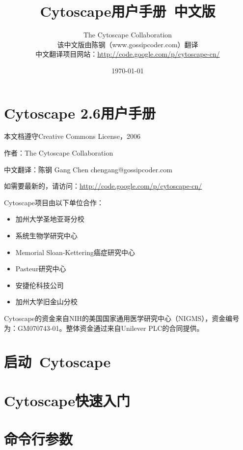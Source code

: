 \documentclass[a4paper, oneside]{book}
\begin{document}
\begin{CJK}{UTF8}{gbsn}
\author{The Cytoscape Collaboration \\ 该中文版由陈钢（www.gossipcoder.com）翻译 \\ 中文翻译项目网站：\url{http://code.google.com/p/cytoscape-cn/}}
\title{Cytoscape用户手册~中文版}
\date{\today}
\maketitle
\tableofcontents

\chapter*{Cytoscape 2.6用户手册}
本文档遵守Creative Commons License，2006

作者：The Cytoscape Collaboration

中文翻译：陈钢 Gang Chen chengang@gossipcoder.com

如需要最新的，请访问：\url{http://code.google.com/p/cytoscape-cn/}

Cytoscape项目由以下单位合作：
\begin{itemize}
\item 加州大学圣地亚哥分校
\item 系统生物学研究中心
\item Memorial Sloan-Kettering癌症研究中心
\item Pasteur研究中心
\item 安捷伦科技公司
\item 加州大学旧金山分校
\end{itemize}

Cytoscape的资金来自NIH的美国国家通用医学研究中心（NIGMS），资金编号为：GM070743-01。整体资金通过来自Unilever PLC的合同提供。



\chapter{启动~Cytoscape}


\chapter{Cytoscape快速入门}


\chapter{命令行参数}



\end{CJK}
\end{document}
